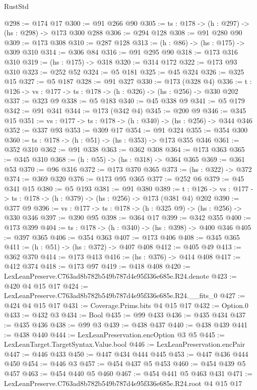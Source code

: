 \begin{lexlean}{RustStd}
\begin{coremodule}
@298 := @174 @17
@300 := @91 @266 @90
@305 := {ts : @178} -> (h : @297) -> (hs : @298) -> @173 @300 @288
@306 := @294 @128
@308 := @91 @280 @90
@309 := @173 @308
@310 := @287 @128
@313 := (h : @86) -> (hs : @175) -> @309 @310
@314 := @306 @84
@316 := @91 @295 @90
@318 := @173 @316 @310
@319 := (hs : @175) -> @318
@320 := @314 @172
@322 := @173 @93 @310
@323 := @252 @52
@324 := @5 @181
@325 := @45 @324
@326 := @325 @15
@327 := @5 @187
@328 := @91 @327
@330 := @173 (@328 @4)
@336 := {t : @126} -> {vs : @177} -> {ts : @178} -> (h : @326) -> (hs : @256) -> @330 @202
@337 := @323 @9
@338 := @5 @183
@340 := @45 @338 @9
@341 := @5 @179
@342 := @91 @341
@344 := @173 (@342 @4)
@345 := @200 @9
@346 := @345 @15
@351 := {vs : @177} -> {ts : @178} -> (h : @340) -> (hs : @256) -> @344 @346
@352 := @337 @93
@353 := @309 @17
@354 := @91 @324
@355 := @354 @300
@360 := {ts : @178} -> (h : @51) -> (hs : @353) -> @173 @355 @346
@361 := @352 @310
@362 := @91 @338
@363 := @362 @308
@364 := @173 @363
@365 := @345 @310
@368 := (h : @55) -> (hs : @318) -> @364 @365
@369 := @361 @53
@370 := @96 @316
@372 := @173 @370 @365
@373 := (hs : @322) -> @372
@374 := @369 @320
@376 := @173 @95 @365
@377 := @252 @6
@379 := @45 @341 @15
@380 := @5 @193
@381 := @91 @380
@389 := {t : @126} -> {vs : @177} -> {ts : @178} -> (h : @379) -> (hs : @256) -> @173 (@381 @4) @202
@390 := @377 @9
@396 := {vs : @177} -> {ts : @178} -> (h : @325 @9) -> (hs : @256) -> @330 @346
@397 := @390 @95
@398 := @364 @17
@399 := @342 @355
@400 := @173 @399
@404 := {ts : @178} -> (h : @340) -> (hs : @398) -> @400 @346
@405 := @397 @365
@406 := @354 @363
@407 := @173 @406
@408 := @345 @365
@411 := (h : @51) -> (hs : @372) -> @407 @408
@412 := @405 @49
@413 := @362 @370
@414 := @173 @413
@416 := (hs : @376) -> @414 @408
@417 := @412 @374
@418 := @173 @97
@419 := @418 @408
@420 := LexLeanPreserve.C763ad8b782b549b787d4e95f336e685e.R24.denote
@423 := @420 @4 @15 @17
@424 := LexLeanPreserve.C763ad8b782b549b787d4e95f336e685e.R24.__fits_0
@427 := @424 @4 @15 @17
@431 := Coverage.Prims.bits @4 @15 @17
@432 := Option.{0}
@433 := @432 @3
@434 := Bool
@435 := @99 @433
@436 := @435 @434
@437 := @435 @436
@438 := @99 @3
@439 := @438 @437
@440 := @438 @439
@441 := @438 @440
@444 := LexLeanPreservation.encOption @3 @5
@445 := LexLeanTarget.TargetSyntax.Value.bool
@446 := LexLeanPreservation.encPair
@447 := @446 @433
@450 := @447 @434 @444 @445
@453 := @447 @436 @444 @450
@454 := @446 @3
@457 := @454 @437 @5 @453
@460 := @454 @439 @5 @457
@463 := @454 @440 @5 @460
@467 := @454 @441 @5 @463 @431
@471 := LexLeanPreserve.C763ad8b782b549b787d4e95f336e685e.R24.root @4 @15 @17

\end{coremodule}
\end{lexlean}
